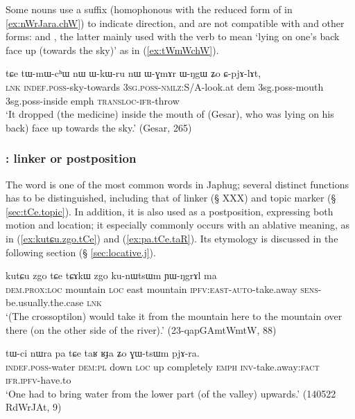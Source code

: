 Some nouns use a suffix  (homophonous with the reduced form of  in \ref{ex:nWrJara.chW}) to indicate direction, and are not compatible with  and other forms:  and , the latter mainly used with the verb  to mean `lying on one's back face up (towards the sky)' as in (\ref{ex:tWmWchW}).

\begin{exe}
\ex \label{ex:tWmWchW} 
\gll tɕe tɯ-mɯ-cʰɯ nɯ ɯ-kɯ-ru nɯ ɯ-ɣmɤr ɯ-ŋgɯ ʑo ɕ-pjɤ-lɤt, \\
\textsc{lnk} \textsc{indef}.\textsc{poss}-sky-towards \textsc{3sg}.\textsc{poss}-\textsc{nmlz}:S/A-look.at dem 3sg.poss-mouth 3sg.poss-inside emph \textsc{transloc}-\textsc{ifr}-throw \\
\glt `It dropped (the medicine) inside the mouth of (Gesar), who was lying on his back) face up towards the sky.' (Gesar, 265)
\end{exe}

\subsubsection{: linker or postposition} \label{sec:tCe.postposition}
The word  is one of the most common words in Japhug; several distinct functions has to be distinguished, including that of linker (§ XXX) and topic marker (§ \ref{sec:tCe.topic}). In addition, it is also used as a postposition, expressing both motion and location; it especially commonly occurs with an ablative meaning, as in (\ref{ex:kutɕu.zgo.tCe}) and (\ref{ex:pa.tCe.taR}). Its etymology is discussed in the following section (§ \ref{sec:locative.j}).

\begin{exe}
\ex \label{ex:kutɕu.zgo.tCe}
\gll kutɕu zgo tɕe tɕɤkɯ zgo ku-nɯtsɯm ɲɯ-ŋgrɤl ma \\
\textsc{dem}.\textsc{prox}:\textsc{loc} mountain \textsc{loc} east mountain \textsc{ipfv}:\textsc{east}-\textsc{auto}-take.away \textsc{sens}-be.usually.the.case \textsc{lnk} \\
\glt `(The crossoptilon) would take it from the mountain here to the mountain over there (on the other side of the river).' (23-qapGAmtWmtW, 88)
\end{exe}

\begin{exe}
\ex \label{ex:pa.tCe.taR}
\gll tɯ-ci nɯra pa tɕe taʁ ʁɟa ʑo ɣɯ-tsɯm pjɤ-ra. \\
\textsc{indef}.\textsc{poss}-water \textsc{dem}:\textsc{pl} down \textsc{loc} up completely \textsc{emph} \textsc{inv}-take.away:\textsc{fact} \textsc{ifr}.\textsc{ipfv}-have.to \\
\glt `One had to bring water from the lower part (of the valley) upwards.' (140522 RdWrJAt, 9)
\end{exe}

